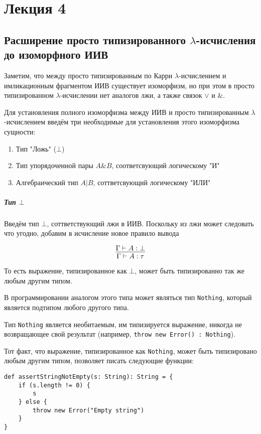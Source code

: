 \section{Лекция 4}

\subsection{Расширение просто типизированного $\lambda$-исчисления до изоморфного ИИВ}

Заметим, что между просто типизированным по Карри $\lambda$-исчислением и имликационным фрагментом ИИВ существует изоморфизм, но при этом в просто типизированном $\lambda$-исчислении нет аналогов лжи, а также связок $\vee$ и $\&$.

Для установления полного изоморфизма между ИИВ и просто типизированным $\lambda$-исчислением введём три необходимые для установления этого изоморфизма сущности:

\begin{enumerate}
	\item Тип "Ложь" ($\bot$)
	
	\item Тип упорядоченной пары $A\&B$, соответсвующий	логическому "И"
	
	\item Алгебраический тип $A | B$, соттветсвующий логическому "ИЛИ"
\end{enumerate}

\subparagraph{Тип $\bot$}

Введём тип $\bot$, соттветствующий лжи в ИИВ. Поскольку из лжи может следовать что угодно, добавим в исчисление новое правило вывода

\[
\infer{\Gamma \vdash A : \tau}{\Gamma \vdash A: \bot}
\]

То есть выражение, типизированное как $\bot$, может быть типизированно так же любым другим типом.

В программировании аналогом этого типа может являться тип \texttt{Nothing}, который является подтипом любого другого типа.

Тип \texttt{Nothing} является необитаемым, им типизируется выражение, никогда не возвращающее свой результат (например, \texttt{throw new Error() : Nothing}). 

Тот факт, что выражение, типизированное как \texttt{Nothing}, может быть типизировано любым другим типом, позволяет писать следующие функции:

\begin{verbatim}
def assertStringNotEmpty(s: String): String = {
	if (s.length != 0) {
		s
	} else {
		throw new Error("Empty string")
	}
}
\end{verbatim}


